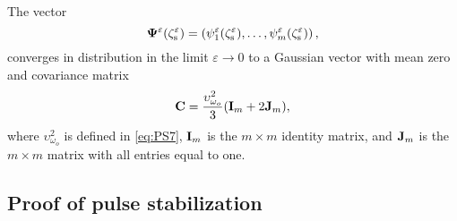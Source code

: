 \documentclass[final]{siamltex}
\begin{document}
\vspace{0.05in}
\begin{lemma} 
\label{lem.D2} The vector 
\begin{equation}
\boldsymbol{\Psi}^{\varepsilon}(\zeta_{\rm s}^{\varepsilon}) = \left(\psi_1^{\varepsilon}(\zeta_{\rm s}^{\varepsilon}), 
\ldots, \psi_m^{\varepsilon}(\zeta_{\rm s}^{\varepsilon}) \right), \label{eq:process}
\end{equation}
converges in distribution in the limit ${\varepsilon} \to 0$ to a Gaussian vector with mean zero
and covariance matrix
\begin{equation}
{\bf C} = \frac{\upsilon_{{\omega}_o}^2}{3} ({\bf I}_m + 2 {\bf J}_m),
\label{eq:covar}
\end{equation}
where $\upsilon_{{\omega}_o}^2$ is defined in \eqref{eq:PS7}, ${\bf I}_m$ is the $m \times m$
identity matrix, and ${\bf J}_m$ is the $m \times m$
matrix with all entries equal to one.
\end{lemma}
\subsection{Proof of pulse stabilization}
\label{sect:proof3}
\end{document}
